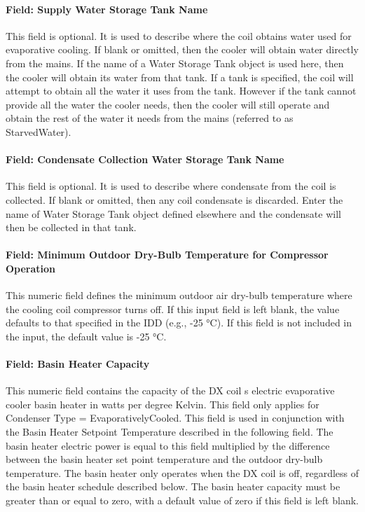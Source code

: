 \paragraph{Field: Supply Water Storage Tank Name}\label{field-supply-water-storage-tank-name-2-000}

This field is optional. It is used to describe where the coil obtains water used for evaporative cooling. If blank or omitted, then the cooler will obtain water directly from the mains. If the name of a Water Storage Tank object is used here, then the cooler will obtain its water from that tank. If a tank is specified, the coil will attempt to obtain all the water it uses from the tank. However if the tank cannot provide all the water the cooler needs, then the cooler will still operate and obtain the rest of the water it needs from the mains (referred to as StarvedWater).

\paragraph{Field: Condensate Collection Water Storage Tank Name}\label{field-condensate-collection-water-storage-tank-name-4}

This field is optional. It is used to describe where condensate from the coil is collected. If blank or omitted, then any coil condensate is discarded. Enter the name of Water Storage Tank object defined elsewhere and the condensate will then be collected in that tank.

\paragraph{Field: Minimum Outdoor Dry-Bulb Temperature for Compressor Operation}\label{field-minimum-outdoor-dry-bulb-temperature-for-compressor-operation}

This numeric field defines the minimum outdoor air dry-bulb temperature where the cooling coil compressor turns off. If this input field is left blank, the value defaults to that specified in the IDD (e.g., -25 °C). If this field is not included in the input, the default value is -25 °C.

\paragraph{Field: Basin Heater Capacity}\label{field-basin-heater-capacity-2-000}

This numeric field contains the capacity of the DX coil s electric evaporative cooler basin heater in watts per degree Kelvin. This field only applies for Condenser Type = EvaporativelyCooled. This field is used in conjunction with the Basin Heater Setpoint Temperature described in the following field. The basin heater electric power is equal to this field multiplied by the difference between the basin heater set point temperature and the outdoor dry-bulb temperature. The basin heater only operates when the DX coil is off, regardless of the basin heater schedule described below. The basin heater capacity must be greater than or equal to zero, with a default value of zero if this field is left blank.


